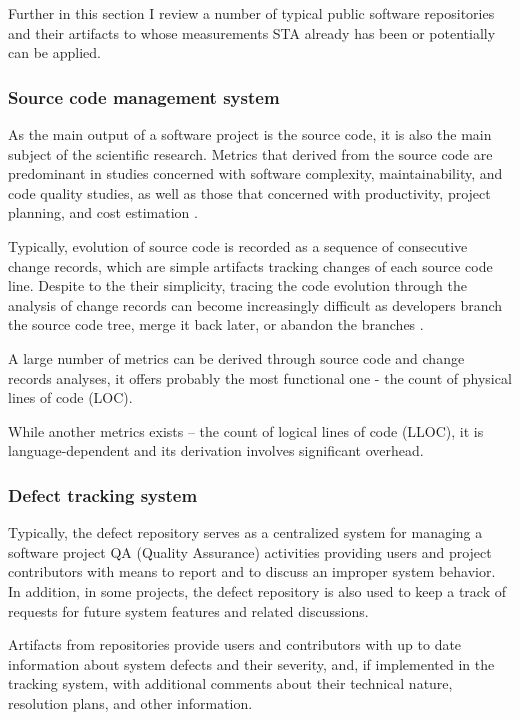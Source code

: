 Further in this section I review a number of typical public software repositories and their artifacts to whose measurements 
STA already has been or potentially can be applied. 

\subsubsection{Source code management system}
As the main output of a software project is the source code, it is also the main subject of the scientific research. 
Metrics that derived from the source code are predominant in studies concerned with software complexity, maintainability,
and code quality studies, as well as those that concerned with productivity, project planning, 
and cost estimation \cite{citeulike:4534888}. 

Typically, evolution of source code is recorded as a sequence of consecutive change records, which are simple artifacts 
tracking changes of each source code line. Despite to the their simplicity, tracing the code evolution through the analysis 
of change records can become increasingly difficult as developers branch the source code tree, merge it back later, 
or abandon the branches \cite{citeulike:13156191}.

A large number of metrics can be derived through source code and change records analyses, it offers probably the most functional one - the count of physical 
lines of code (LOC). 

While another metrics exists -- the count of logical lines of code (LLOC), it is language-dependent and its derivation involves 
significant overhead.


\subsubsection{Defect tracking system}
Typically, the defect repository serves as a centralized system for managing a software project QA (Quality Assurance) activities
providing users and project contributors with means to report and to discuss an improper system behavior.
In addition, in some projects, the defect repository is also used to keep a track of requests for future system features and related
discussions.

Artifacts from repositories provide users and contributors with up to date information about system defects and their severity, and, 
if implemented in the tracking system, with additional comments about their technical nature, resolution plans, and other information. 

